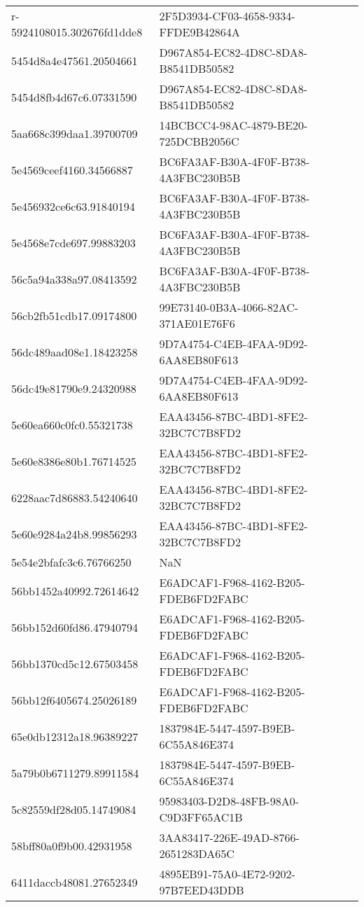 \begin{tabular}{ll}
r-5924108015.302676fd1dde8 & 2F5D3934-CF03-4658-9334-FFDE9B42864A \\
5454d8a4e47561.20504661 & D967A854-EC82-4D8C-8DA8-B8541DB50582 \\
5454d8fb4d67c6.07331590 & D967A854-EC82-4D8C-8DA8-B8541DB50582 \\
5aa668c399daa1.39700709 & 14BCBCC4-98AC-4879-BE20-725DCBB2056C \\
5e4569ceef4160.34566887 & BC6FA3AF-B30A-4F0F-B738-4A3FBC230B5B \\
5e456932ce6c63.91840194 & BC6FA3AF-B30A-4F0F-B738-4A3FBC230B5B \\
5e4568e7cde697.99883203 & BC6FA3AF-B30A-4F0F-B738-4A3FBC230B5B \\
56c5a94a338a97.08413592 & BC6FA3AF-B30A-4F0F-B738-4A3FBC230B5B \\
56cb2fb51cdb17.09174800 & 99E73140-0B3A-4066-82AC-371AE01E76F6 \\
56dc489aad08e1.18423258 & 9D7A4754-C4EB-4FAA-9D92-6AA8EB80F613 \\
56dc49e81790e9.24320988 & 9D7A4754-C4EB-4FAA-9D92-6AA8EB80F613 \\
5e60ea660c0fc0.55321738 & EAA43456-87BC-4BD1-8FE2-32BC7C7B8FD2 \\
5e60e8386e80b1.76714525 & EAA43456-87BC-4BD1-8FE2-32BC7C7B8FD2 \\
6228aac7d86883.54240640 & EAA43456-87BC-4BD1-8FE2-32BC7C7B8FD2 \\
5e60e9284a24b8.99856293 & EAA43456-87BC-4BD1-8FE2-32BC7C7B8FD2 \\
5e54e2bfafc3c6.76766250 & NaN \\
56bb1452a40992.72614642 & E6ADCAF1-F968-4162-B205-FDEB6FD2FABC \\
56bb152d60fd86.47940794 & E6ADCAF1-F968-4162-B205-FDEB6FD2FABC \\
56bb1370cd5c12.67503458 & E6ADCAF1-F968-4162-B205-FDEB6FD2FABC \\
56bb12f6405674.25026189 & E6ADCAF1-F968-4162-B205-FDEB6FD2FABC \\
65e0db12312a18.96389227 & 1837984E-5447-4597-B9EB-6C55A846E374 \\
5a79b0b6711279.89911584 & 1837984E-5447-4597-B9EB-6C55A846E374 \\
5c82559df28d05.14749084 & 95983403-D2D8-48FB-98A0-C9D3FF65AC1B \\
58bff80a0f9b00.42931958 & 3AA83417-226E-49AD-8766-2651283DA65C \\
6411daccb48081.27652349 & 4895EB91-75A0-4E72-9202-97B7EED43DDB \\

\end{tabular}
